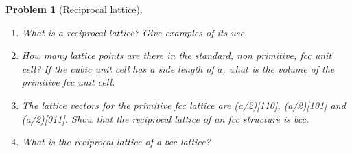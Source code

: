 \documentclass[a4paper]{article}
\theoremstyle{new}
\newtheorem{qns}{Problem}[section]
\begin{document}
\newpage
\begin{qns}[Reciprocal lattice]\leavevmode
\begin{enumerate}[label=(\alph*)]
\item What is a reciprocal lattice? Give examples of its use.
\item How many lattice points are there in the standard, non primitive, fcc unit cell? If the cubic unit cell has a side length of $a$, what is the volume of the primitive fcc unit cell.
\item The lattice vectors for the primitive fcc lattice are (a/2)[110], (a/2)[101] and (a/2)[011]. Show that the reciprocal lattice of an fcc structure is bcc.
\item What is the reciprocal lattice of a bcc lattice?
\end{enumerate}
\end{qns}
\end{document}

